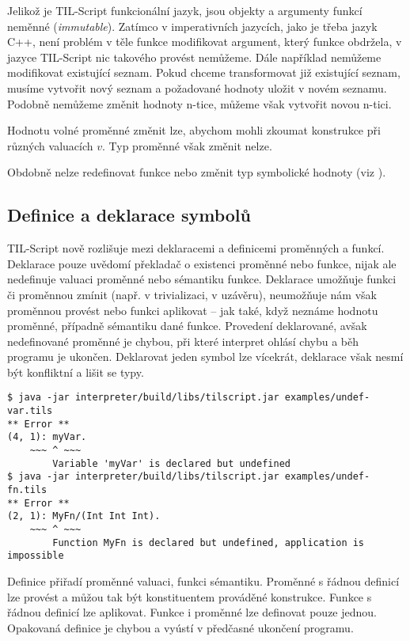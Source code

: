 Jelikož je TIL-Script funkcionální jazyk, jsou objekty a argumenty funkcí neměnné
(\textit{immutable}). Zatímco v imperativních jazycích, jako je třeba jazyk C++, není problém
v těle funkce modifikovat argument, který funkce obdržela, v jazyce TIL-Script nic takového provést
nemůžeme. Dále například nemůžeme modifikovat existující seznam. Pokud chceme transformovat již
existující seznam, musíme vytvořit nový seznam a požadované hodnoty uložit v novém seznamu. Podobně
nemůžeme změnit hodnoty n-tice, můžeme však vytvořit novou n-tici.

Hodnotu volné proměnné změnit lze, abychom mohli zkoumat konstrukce při různých valuacích $v$.
Typ proměnné však změnit nelze.

Obdobně nelze redefinovat funkce nebo změnit typ symbolické hodnoty
(viz ).

\subsection{Definice a deklarace symbolů}

TIL-Script nově rozlišuje mezi deklaracemi a definicemi proměnných a funkcí. Deklarace pouze
uvědomí překladač o existenci proměnné nebo funkce, nijak ale nedefinuje valuaci proměnné nebo
sémantiku funkce. Deklarace umožňuje funkci či proměnnou zmínit (např. v trivializaci, v uzávěru),
neumožňuje nám však proměnnou provést nebo funkci aplikovat -- jak také, když neznáme hodnotu
proměnné, případně sémantiku dané funkce. Provedení deklarované, avšak nedefinované proměnné
je chybou, při které interpret ohlásí chybu a běh programu je ukončen. Deklarovat jeden symbol
lze vícekrát, deklarace však nesmí být konfliktní a lišit se typy.

\begin{lstlisting}[caption={Hlášení chyby při chybějící definici}]
$ java -jar interpreter/build/libs/tilscript.jar examples/undef-var.tils
** Error **
(4, 1): myVar.
    ~~~ ^ ~~~
        Variable 'myVar' is declared but undefined
$ java -jar interpreter/build/libs/tilscript.jar examples/undef-fn.tils
** Error **
(2, 1): MyFn/(Int Int Int).
    ~~~ ^ ~~~
        Function MyFn is declared but undefined, application is impossible
\end{lstlisting}

Definice přiřadí proměnné valuaci, funkci sémantiku. Proměnné s řádnou definicí lze provést
a můžou tak být konstituentem prováděné konstrukce. Funkce s řádnou definicí lze aplikovat. Funkce
i proměnné lze definovat pouze jednou. Opakovaná definice je chybou a vyústí v předčasné ukončení
programu.

